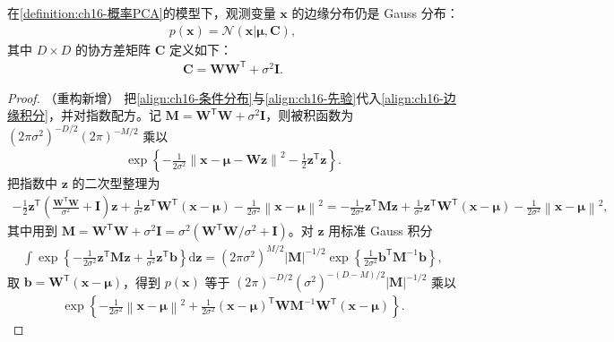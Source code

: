 \documentclass[../../main.tex]{subfiles}
\begin{document}
\begin{proposition}\label{proposition:ch16-边缘分布}
在\cref{definition:ch16-概率PCA}的模型下，观测变量 $\bm{x}$ 的边缘分布仍是 Gauss 分布：
\begin{align}
  p(\bm{x})=\mathcal{N}(\bm{x}|\bm{\mu},\bm{C}),
  \label{align:ch16-边缘分布}
\end{align}
其中 $D\times D$ 的协方差矩阵 $\bm{C}$ 定义如下：
\begin{align}
  \bm{C}=\bm{W}\bm{W}^{\mathsf T}+\sigma^2\bm{I}.
  \label{align:ch16-边缘协方差}
\end{align}
\end{proposition}

\begin{proof}（重构新增）
把\eqref{align:ch16-条件分布}与\eqref{align:ch16-先验}代入\eqref{align:ch16-边缘积分}，并对指数配方。记 $\bm{M}=\bm{W}^{\mathsf T}\bm{W}+\sigma^2\bm{I}$，则被积函数为 $(2\pi\sigma^2)^{-D/2}(2\pi)^{-M/2}$ 乘以
\begin{align*}
  \exp\left\{-\frac{1}{2\sigma^2}\left\|\bm{x}-\bm{\mu}-\bm{W}\bm{z}\right\|^2-\frac{1}{2}\bm{z}^{\mathsf T}\bm{z}\right\}.
\end{align*}
把指数中 $\bm{z}$ 的二次型整理为
\begin{align*}
  -\frac{1}{2}\bm{z}^{\mathsf T}\left(\frac{\bm{W}^{\mathsf T}\bm{W}}{\sigma^2}+\bm{I}\right)\bm{z}+\frac{1}{\sigma^2}\bm{z}^{\mathsf T}\bm{W}^{\mathsf T}(\bm{x}-\bm{\mu})-\frac{1}{2\sigma^2}\left\|\bm{x}-\bm{\mu}\right\|^2
  =-\frac{1}{2\sigma^2}\bm{z}^{\mathsf T}\bm{M}\bm{z}+\frac{1}{\sigma^2}\bm{z}^{\mathsf T}\bm{W}^{\mathsf T}(\bm{x}-\bm{\mu})-\frac{1}{2\sigma^2}\left\|\bm{x}-\bm{\mu}\right\|^2,
\end{align*}
其中用到 $\bm{M}=\bm{W}^{\mathsf T}\bm{W}+\sigma^2\bm{I}=\sigma^2\left(\bm{W}^{\mathsf T}\bm{W}/\sigma^2+\bm{I}\right)$。对 $\bm{z}$ 用标准 Gauss 积分
\begin{align*}
  \int\exp\left\{-\frac{1}{2\sigma^2}\bm{z}^{\mathsf T}\bm{M}\bm{z}+\frac{1}{\sigma^2}\bm{z}^{\mathsf T}\bm{b}\right\}\mathrm{d}\bm{z}=(2\pi\sigma^2)^{M/2}|\bm{M}|^{-1/2}\exp\left\{\frac{1}{2\sigma^2}\bm{b}^{\mathsf T}\bm{M}^{-1}\bm{b}\right\},
\end{align*}
取 $\bm{b}=\bm{W}^{\mathsf T}(\bm{x}-\bm{\mu})$，得到 $p(\bm{x})$ 等于 $(2\pi)^{-D/2}(\sigma^2)^{-(D-M)/2}|\bm{M}|^{-1/2}$ 乘以
\begin{align*}
  \exp\left\{-\frac{1}{2\sigma^2}\left\|\bm{x}-\bm{\mu}\right\|^2+\frac{1}{2\sigma^2}(\bm{x}-\bm{\mu})^{\mathsf T}\bm{W}\bm{M}^{-1}\bm{W}^{\mathsf T}(\bm{x}-\bm{\mu})\right\}.

\end{align*}
\end{proof}
\end{document}
